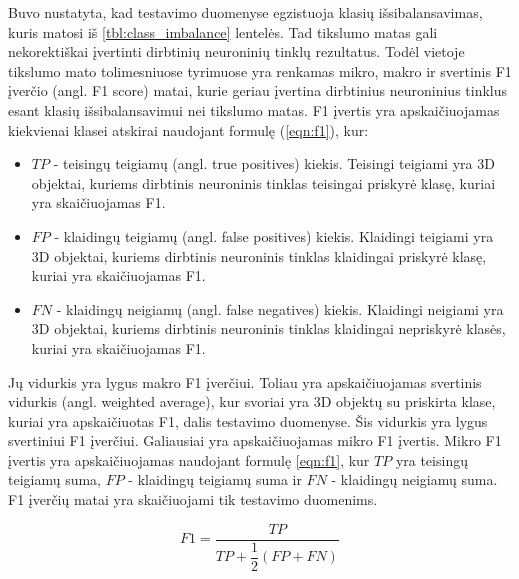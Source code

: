 Buvo nustatyta, kad testavimo duomenyse egzistuoja klasių išsibalansavimas, kuris matosi iš \ref{tbl:class_imbalance} lentelės. Tad tikslumo matas gali nekorektiškai įvertinti dirbtinių neuroninių tinklų rezultatus. Todėl vietoje tikslumo mato tolimesniuose tyrimuose yra renkamas mikro, makro ir svertinis F1 įverčio (angl. F1 score) matai, kurie geriau įvertina dirbtinius neuroninius tinklus esant klasių išsibalansavimui nei tikslumo matas. F1 įvertis yra apskaičiuojamas kiekvienai klasei atskirai naudojant formulę (\ref{eqn:f1}), kur:

\begin{itemize}
	\item $TP$ - teisingų teigiamų (angl. true positives) kiekis. Teisingi teigiami yra 3D objektai, kuriems dirbtinis neuroninis tinklas teisingai priskyrė klasę, kuriai yra skaičiuojamas F1.
	\item $FP$ - klaidingų teigiamų (angl. false positives) kiekis. Klaidingi teigiami yra 3D objektai, kuriems dirbtinis neuroninis tinklas klaidingai priskyrė klasę, kuriai yra skaičiuojamas F1.
	\item $FN$ - klaidingų neigiamų (angl. false negatives) kiekis. Klaidingi neigiami yra 3D objektai, kuriems dirbtinis neuroninis tinklas klaidingai nepriskyrė klasės, kuriai yra skaičiuojamas F1.
\end{itemize}

Jų vidurkis yra lygus makro F1 įverčiui. Toliau yra apskaičiuojamas svertinis vidurkis (angl. weighted average), kur svoriai yra 3D objektų su priskirta klase, kuriai yra apskaičiuotas F1, dalis testavimo duomenyse. Šis vidurkis yra lygus svertiniui F1 įverčiui. Galiausiai yra apskaičiuojamas mikro F1 įvertis. Mikro F1 įvertis yra apskaičiuojamas naudojant formulę \ref{eqn:f1}, kur $TP$ yra teisingų teigiamų suma, $FP$ - klaidingų teigiamų suma ir $FN$ - klaidingų neigiamų suma. F1 įverčių matai yra skaičiuojami tik testavimo duomenims.

\begin{equation}
\label{eqn:f1}
	F1 = \dfrac{TP}{TP + \dfrac{1}{2}(FP + FN)}
\end{equation}

